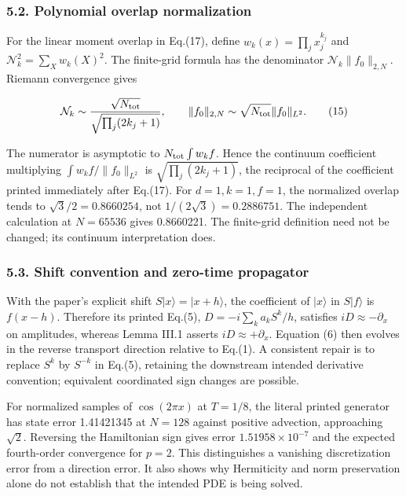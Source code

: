 \subsubsection{5.2. Polynomial overlap
normalization}\label{polynomial-overlap-normalization}

For the linear moment overlap in Eq.(17), define
\(w_k(x)=\prod_j x_j^{k_j}\) and \(\mathcal N_k^2=\sum_Xw_k(X)^2\). The
finite-grid formula has the denominator \(\mathcal N_k\|f_0\|_{2,N}\).
Riemann convergence gives

\[
\mathcal N_k\sim {\sqrt{N_{\rm tot}}\over\sqrt{\prod_j(2k_j+1)}},\qquad
\|f_0\|_{2,N}\sim\sqrt{N_{\rm tot}}\|f_0\|_{L^2}. \tag{15}
\]

The numerator is asymptotic to \(N_{\rm tot}\int w_k f\). Hence the
continuum coefficient multiplying \(\int w_k f/\|f_0\|_{L^2}\) is
\(\sqrt{\prod_j(2k_j+1)}\), the reciprocal of the coefficient printed
immediately after Eq.(17). For \(d=1,k=1,f=1\), the normalized overlap
tends to \(\sqrt3/2=0.8660254\), not \(1/(2\sqrt3)=0.2886751\). The
independent calculation at \(N=65536\) gives 0.8660221. The finite-grid
definition need not be changed; its continuum interpretation does.

\subsubsection{5.3. Shift convention and zero-time
propagator}\label{shift-convention-and-zero-time-propagator}

With the paper's explicit shift \(S|x\rangle=|x+h\rangle\), the
coefficient of \(|x\rangle\) in \(S|f\rangle\) is \(f(x-h)\). Therefore
its printed Eq.(5), \(D=-i\sum_ka_k S^k/h\), satisfies
\(iD\approx-\partial_x\) on amplitudes, whereas Lemma III.1 asserts
\(iD\approx+\partial_x\). Equation (6) then evolves in the reverse
transport direction relative to Eq.(1). A consistent repair is to
replace \(S^k\) by \(S^{-k}\) in Eq.(5), retaining the downstream
intended derivative convention; equivalent coordinated sign changes are
possible.

For normalized samples of \(\cos(2\pi x)\) at \(T=1/8\), the literal
printed generator has state error 1.41421345 at \(N=128\) against
positive advection, approaching \(\sqrt2\). Reversing the Hamiltonian
sign gives error \(1.51958\times10^{-7}\) and the expected fourth-order
convergence for \(p=2\). This distinguishes a vanishing discretization
error from a direction error. It also shows why Hermiticity and norm
preservation alone do not establish that the intended PDE is being
solved.

